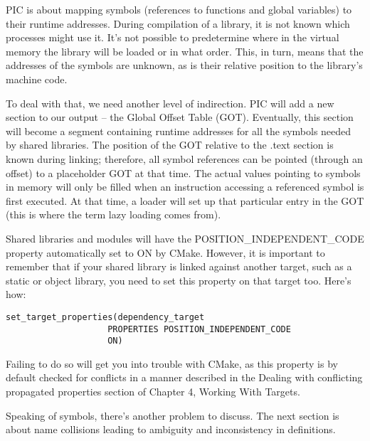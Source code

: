 PIC is about mapping symbols (references to functions and global variables) to their runtime addresses. During compilation of a library, it is not known which processes might use it. It's not possible to predetermine where in the virtual memory the library will be loaded or in what order. This, in turn, means that the addresses of the symbols are unknown, as is their relative position to the library's machine code.

To deal with that, we need another level of indirection. PIC will add a new section to our output – the Global Offset Table (GOT). Eventually, this section will become a segment containing runtime addresses for all the symbols needed by shared libraries. The position of the GOT relative to the .text section is known during linking; therefore, all symbol references can be pointed (through an offset) to a placeholder GOT at that time. The actual values pointing to symbols in memory will only be filled when an instruction accessing a referenced symbol is first executed. At that time, a loader will set up that particular entry in the GOT (this is where the term lazy loading comes from).

Shared libraries and modules will have the POSITION\_INDEPENDENT\_CODE property automatically set to ON by CMake. However, it is important to remember that if your shared library is linked against another target, such as a static or object library, you need to set this property on that target too. Here's how:

\begin{lstlisting}[style=styleCMake]
set_target_properties(dependency_target
					PROPERTIES POSITION_INDEPENDENT_CODE
					ON)
\end{lstlisting}

Failing to do so will get you into trouble with CMake, as this property is by default checked for conflicts in a manner described in the Dealing with conflicting propagated properties section of Chapter 4, Working With Targets.

Speaking of symbols, there's another problem to discuss. The next section is about name collisions leading to ambiguity and inconsistency in definitions.











